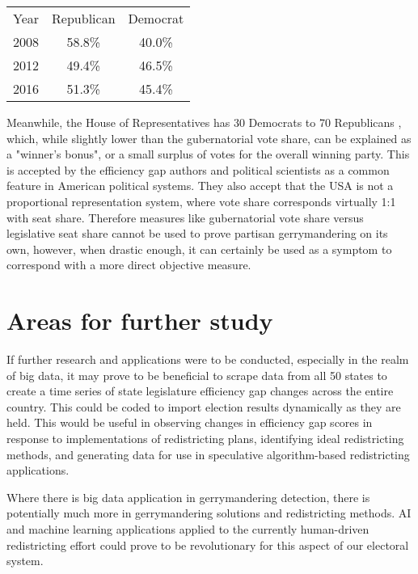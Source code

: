 \documentclass[sigconf]{acmart}
\begin{document}
\begin{center}
    \begin{tabular}{ |c|c|c| }
    \hline
    Year & Republican & Democrat \\
    2008 & 58.8\%  & 40.0\% \\
    2012 & 49.4\% & 46.5\% \\
    2016 & 51.3\% & 45.4\% \\
    \hline
    \end{tabular}
\end{center}

Meanwhile, the House of Representatives has 30 Democrats to 70 Republicans \cite{houseresults}, which, while slightly lower than the gubernatorial vote share, can be explained as a "winner's bonus", or a small surplus of votes for the overall winning party. This is accepted by the efficiency gap authors and political scientists as a common feature in American political systems. They also accept that the USA is not a proportional representation system, where vote share corresponds virtually 1:1 with seat share.\cite{chicagoformula} Therefore measures like gubernatorial vote share versus legislative seat share cannot be used to prove partisan gerrymandering on its own, however, when drastic enough, it can certainly be used as a symptom to correspond with a more direct objective measure.

\section{Areas for further study}
If further research and applications were to be conducted, especially in the realm of big data, it may prove to be beneficial to scrape data from all 50 states to create a time series of state legislature efficiency gap changes across the entire country. This could be coded to import election results dynamically as they are held. This would be useful in observing changes in efficiency gap scores in response to implementations of redistricting plans, identifying ideal redistricting methods, and generating data for use in speculative algorithm-based redistricting applications.

Where there is big data application in gerrymandering detection, there is potentially much more in gerrymandering solutions and redistricting methods. AI and machine learning applications applied to the currently human-driven redistricting effort could prove to be revolutionary for this aspect of our electoral system. 
\end{document}

